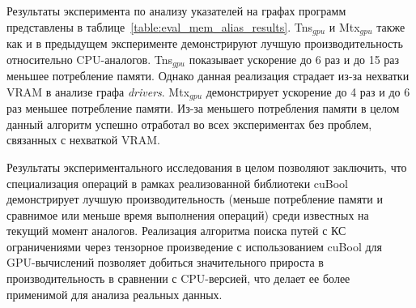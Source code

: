 \begin{table}[h]
\begin{center}
\caption{Анализ RDF данных с использованием запроса $G_{geo}$ (время (t) в секундах, память (m) в мегабайтах, отклонение в пределах 10\%)}
\label{table:eval_rdf_geo_results}
{}
\end{center}
\end{table}

Результаты эксперимента по анализу указателей на графах программ представлены в таблице~\ref{table:eval_mem_alias_results}.
Tns$_{gpu}$ и Mtx$_{gpu}$ также как и в предыдущем эксперименте демонстрируют лучшую производительность относительно CPU-аналогов. Tns$_{gpu}$ показывает ускорение до 6 раз и до 15 раз меньшее потребление памяти. 
Однако данная реализация страдает из-за нехватки VRAM в анализе графа \textit{drivers}.
Mtx$_{gpu}$ демонстрирует ускорение до 4 раз и до 6 раз меньшее потребление памяти. 
Из-за меньшего потребления памяти в целом данный алгоритм успешно отработал во всех экспериментах без проблем, связанных с нехваткой VRAM.

Результаты экспериментального исследования в целом позволяют заключить, 
что специализация операций в рамках реализованной библиотеки cuBool демонстрирует лучшую производительность 
(меньше потребление памяти и сравнимое или меньше время выполнения операций) среди известных на текущий момент аналогов. 
Реализация алгоритма поиска путей с КС ограничениями через тензорное произведение с использованием cuBool для GPU-вычислений позволяет добиться значительного прироста в производительность в сравнении с CPU-версией, 
что делает ее более применимой для анализа реальных данных. 

